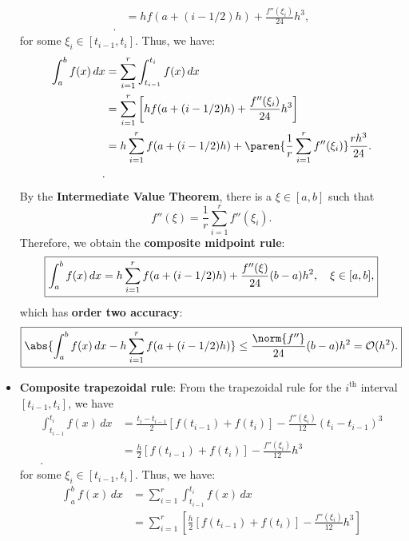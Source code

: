 \documentclass{report}
\begin{document}
\begin{itemize}
\begin{align*}
                & = h f(a + (i - 1/2)h) + \frac{f''(\xi_i)}{24} h^3, \\
            .\end{align*}
            for some $\xi_i \in [t_{i-1},t_i]$.
            Thus, we have:
            \bigbreak \noindent 
            \begin{align*}
                \int_a^b f(x)\,dx 
                &= \sum_{i=1}^r \int_{t_{i-1}}^{t_i} f(x)\,dx \\
                &= \sum_{i=1}^r \left[h f(a + (i - 1/2)h) + \frac{f''(\xi_i)}{24} h^3 \right]\\
                &= h \sum_{i=1}^r f(a + (i - 1/2)h) + \paren{\frac{1}{r} \sum_{i=1}^r f''(\xi_i)} \frac{r h^3}{24} .\\
            .\end{align*}
            \bigbreak \noindent 
            By the \textbf{Intermediate Value Theorem}, there is a $\xi \in [a,b]$ such that
            $$f''(\xi) = \frac{1}{r} \sum_{i=1}^r f''(\xi_i).$$
            Therefore, we obtain the \textbf{composite midpoint rule}:
            $$
            \fbox{${\displaystyle
                    \int_a^b f(x)\,dx = h \sum_{i=1}^r f(a + (i - 1/2)h) + \frac{f''(\xi)}{24} (b - a) h^2, 
                    \quad \xi \in [a,b],
            }$}
            $$
            which has \textbf{order two accuracy}:
            $$
            \fbox{${\displaystyle
                    \abs{\int_a^b f(x)\,dx - h \sum_{i=1}^r f(a + (i - 1/2)h)} \leq \frac{\norm{f''}}{24} (b - a) h^2 = \mathcal{O}(h^2).
            }$}
            $$
        \item \textbf{Composite trapezoidal rule}:
            From the trapezoidal rule for the $i^{\mathrm{th}}$ interval $[t_{i-1},t_i]$, we have
            \begin{align*}
                \int_{t_{i-1}}^{t_i} f(x)\,dx 
                & = \frac{t_i - t_{i-1}}{2}\left[f(t_{i-1}) + f(t_i)\right] - \frac{f''(\xi_i)}{12}(t_i - t_{i-1})^3 \\
                & = \frac{h}{2}\left[f(t_{i-1}) + f(t_i)\right] - \frac{f''(\xi_i)}{12}h^3 \\
            .\end{align*}
            for some $\xi_i \in [t_{i-1},t_i]$.
            \bigbreak \noindent 
            Thus, we have:
            \begin{align*}
                \int_a^b f(x)\,dx 
                &= \sum_{i=1}^r \int_{t_{i-1}}^{t_i} f(x)\,dx \\
                &= \sum_{i=1}^r \left[\frac{h}{2}\left[f(t_{i-1}) + f(t_i)\right] - \frac{f''(\xi_i)}{12}h^3 \right]\\

\end{align*}
\end{itemize}
\end{document}
